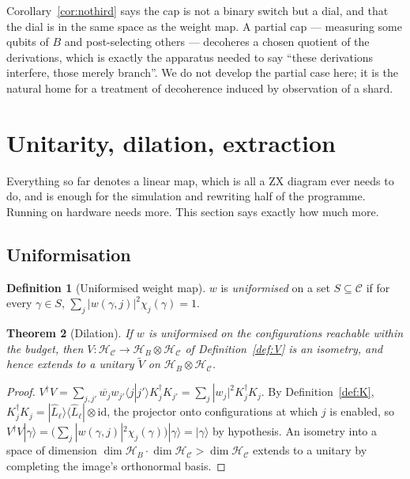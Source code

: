 \documentclass[11pt]{article}
\theoremstyle{definition}
\newtheorem{definition}{Definition}[section]
\theoremstyle{plain}
\newtheorem{theorem}[definition]{Theorem}
\newcommand{\Cfg}{\mathcal{C}}
\newcommand{\Hs}{\mathcal{H}}
\newcommand{\Hc}{\Hs_{\Cfg}}
\newcommand{\Hb}{\Hs_{B}}
\newcommand{\id}{\mathrm{id}}
\newcommand{\bra}[1]{\langle #1 |}
\newcommand{\ket}[1]{| #1 \rangle}
\newcommand{\ketbra}[2]{| #1 \rangle\langle #2 |}
\begin{document}
Corollary~\ref{cor:nothird} says the cap is not a binary switch but a dial, and that the dial is
in the same space as the weight map. A partial cap --- measuring some qubits of $B$ and
post-selecting others --- decoheres a chosen quotient of the derivations, which is exactly the
apparatus needed to say ``these derivations interfere, those merely branch''. We do not develop
the partial case here; it is the natural home for a treatment of decoherence induced by
observation of a shard.

\section{Unitarity, dilation, extraction}\label{sec:unitary}

Everything so far denotes a linear map, which is all a ZX diagram ever needs to do, and is
enough for the simulation and rewriting half of the programme. Running on hardware needs more.
This section says exactly how much more.

\subsection{Uniformisation}

\begin{definition}[Uniformised weight map]\label{def:uniform}
$w$ is \emph{uniformised} on a set $S\subseteq\Cfg$ if for every $\gamma\in S$,
$\sum_{j} |w(\gamma,j)|^2\chi_j(\gamma) = 1$.
\end{definition}

\begin{theorem}[Dilation]\label{thm:dilation}
If $w$ is uniformised on the configurations reachable within the budget, then
$V:\Hc\to\Hb\otimes\Hc$ of Definition~\ref{def:V} is an isometry, and hence extends to a unitary
$\tilde{V}$ on $\Hb\otimes\Hc$.
\end{theorem}

\begin{proof}
$V^\dagger V = \sum_{j,j'}\overline{w_j}w_{j'}\bra{j}j'\rangle K_j^\dagger K_{j'}
= \sum_j |w_j|^2 K_j^\dagger K_j$. By Definition~\ref{def:K},
$K_j^\dagger K_j = \ketbra{\hat{L}_\ell}{\hat{L}_\ell}\otimes\id$, the projector onto
configurations at which $j$ is enabled, so
$V^\dagger V\ket{\gamma} = \bigl(\sum_j|w(\gamma,j)|^2\chi_j(\gamma)\bigr)\ket{\gamma}
= \ket{\gamma}$ by hypothesis. An isometry into a space of dimension
$\dim\Hb\cdot\dim\Hc > \dim\Hc$ extends to a unitary by completing the image's orthonormal basis.
\end{proof}
\end{document}
